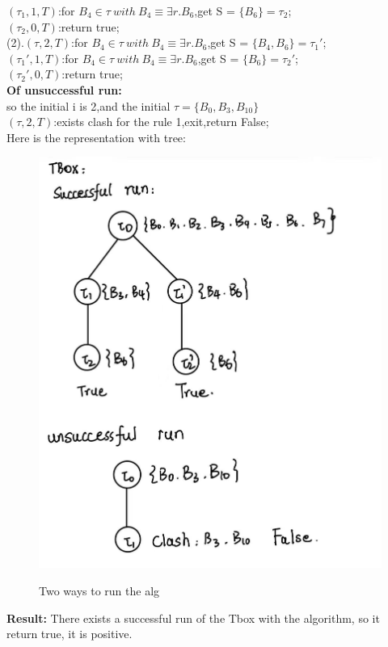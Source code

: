 \documentclass{article}
\begin{document}
    $(\tau_1,1,T)$:for $B_4 \in\tau\ with\ B_4 \equiv\exists r.B_6$,get S = $\{B_6\}= \tau_2$;\\
    $(\tau_2,0,T)$:return true;\\
    (2).$(\tau,2,T)$:for $B_4 \in\tau\ with\ B_4 \equiv\exists r.B_6$,get S = $\{B_4,B_6\}= \tau_1'$;\\
    $(\tau_1',1,T)$:for $B_4 \in\tau\ with\ B_4 \equiv\exists r.B_6$,get S = $\{B_6\}= \tau_2'$;\\
    $(\tau_2',0,T)$:return true;\\
    \textbf{Of unsuccessful run:}\\
    so the initial i is 2,and the initial $\tau = \{B_0,B_3,B_{10}\}$\\
    $(\tau,2,T)$:exists clash for the rule 1,exit,return False;\\
    Here is the representation with tree:\\
    \begin{figure}[H]
        \centering
        \includegraphics[width=1\textwidth]{1.png}\\
        \caption{Two ways to run the alg}
        \label{fig:Two ways to run the alg}
    \end{figure}  
    \textbf{Result:}
    There exists a successful run of the Tbox with the algorithm, so it return true, it is positive.
\end{document}
